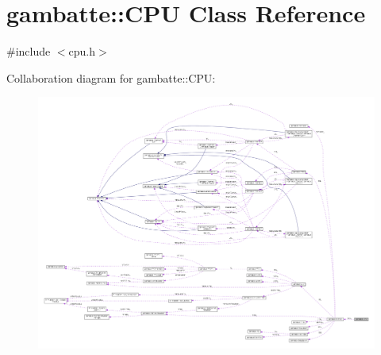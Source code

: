 \hypertarget{classgambatte_1_1CPU}{}\section{gambatte\+:\+:C\+PU Class Reference}
\label{classgambatte_1_1CPU}


{\ttfamily \#include $<$cpu.\+h$>$}



Collaboration diagram for gambatte\+:\+:C\+PU\+:
\nopagebreak
\begin{figure}[H]
\begin{center}
\leavevmode
\includegraphics[width=350pt]{classgambatte_1_1CPU__coll__graph}
\end{center}
\end{figure}
